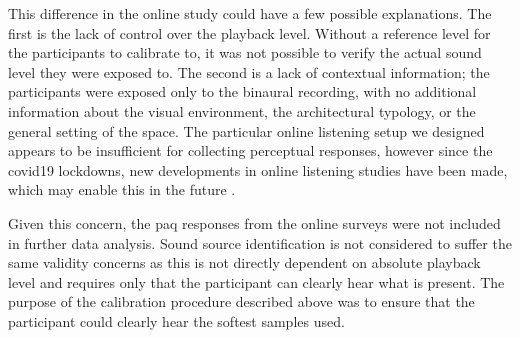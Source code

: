    This difference in the online study could have a few possible explanations. The first is the lack of control over the playback level. Without a reference level for the participants to calibrate to, it was not possible to verify the actual sound level they were exposed to. The second is a lack of contextual information; the participants were exposed only to the binaural recording, with no additional information about the visual environment, the architectural typology, or the general setting of the space. The particular online listening setup we designed appears to be insufficient for collecting perceptual responses, however since the \gls{covid19} lockdowns, new developments in online listening studies have been made, which may enable this in the future \citep{Tan2022, Peng2022}.
   
   Given this concern, the \gls{paq} responses from the online surveys were not included in further data analysis. Sound source identification is not considered to suffer the same validity concerns as this is not directly dependent on absolute playback level and requires only that the participant can clearly hear what is present. The purpose of the calibration procedure described above was to ensure that the participant could clearly hear the softest samples used.

